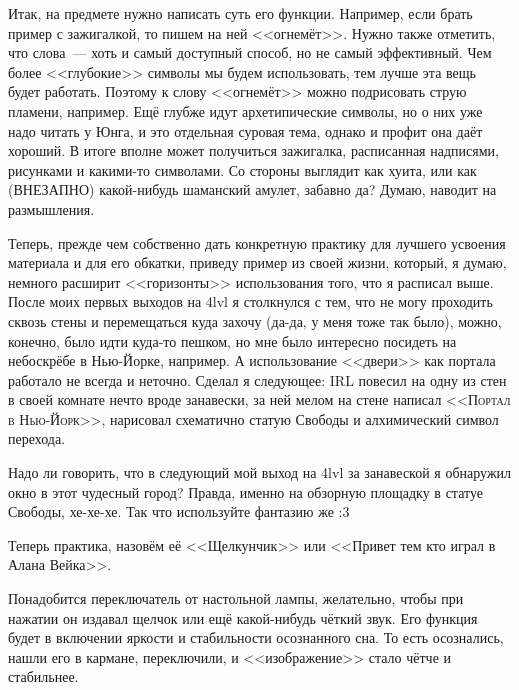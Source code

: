 \documentclass[a4paper,14pt,oneside]{memoir}
\begin{document}
Итак, на предмете нужно написать суть его функции. Например, если брать пример с зажигалкой, то пишем на ней <<огнемёт>>. Нужно также отметить, что слова~--- хоть и самый доступный способ, но не самый эффективный. Чем более <<глубокие>> символы мы будем использовать, тем лучше эта вещь будет работать. Поэтому к слову <<огнемёт>> можно подрисовать струю пламени, например. Ещё глубже идут архетипические символы, но о них уже надо читать у Юнга, и это отдельная суровая тема, однако и профит она даёт хороший. 
В итоге вполне может получиться зажигалка, расписанная надписями, рисунками и какими-то символами. Со стороны выглядит как хуита, или как (ВНЕЗАПНО) какой-нибудь шаманский амулет, забавно да? Думаю, наводит на размышления. 

Теперь, прежде чем собственно дать конкретную практику для лучшего усвоения материала и для его обкатки, приведу пример из своей жизни, который, я думаю, немного расширит <<горизонты>> использования того, что я расписал выше.
\smallskip
После моих первых выходов на 4lvl я столкнулся с тем, что не могу проходить сквозь стены и перемещаться куда захочу (да-да, у меня тоже так было), можно, конечно, было идти куда-то пешком, но мне было интересно посидеть на небоскрёбе в Нью-Йорке, например. А использование <<двери>> как портала работало не всегда и неточно. Сделал я следующее: IRL повесил на одну из стен в своей комнате нечто вроде занавески, за ней мелом на стене написал <<\textsc{Портал в Нью-Йорк}>>, нарисовал схематично статую Свободы и алхимический символ перехода.
 
Надо ли говорить, что в следующий мой выход на 4lvl за занавеской я обнаружил окно в этот чудесный город? Правда, именно на обзорную площадку в статуе Свободы, хе-хе-хе.
Так что используйте фантазию же :3 

Теперь практика, назовём её <<Щелкунчик>> или <<Привет тем кто играл в Алана Вейка>>.
 
Понадобится переключатель от настольной лампы, желательно, чтобы при нажатии он издавал щелчок или ещё какой-нибудь чёткий звук. Его функция будет в включении яркости и стабильности осознанного сна. То есть осознались, нашли его в кармане, переключили, и <<изображение>> стало чётче и стабильнее.
\end{document}
